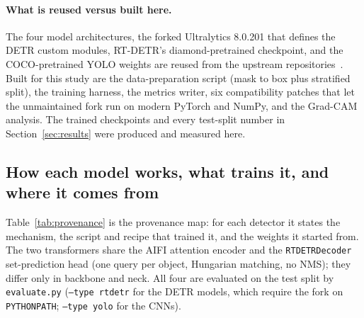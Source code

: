 \documentclass[11pt,a4paper]{article}
\begin{document}
\paragraph{What is reused versus built here.}
The four model architectures, the forked Ultralytics 8.0.201 that defines the DETR custom modules,
RT-DETR's diamond-pretrained checkpoint, and the COCO-pretrained YOLO weights are reused from the
upstream repositories~\cite{diamond,ultralytics}. Built for this study are the data-preparation
script (mask to box plus stratified split), the training harness, the metrics writer, six
compatibility patches that let the unmaintained fork run on modern PyTorch and NumPy, and the
Grad-CAM analysis. The trained checkpoints and every test-split number in Section~\ref{sec:results}
were produced and measured here.

\subsection{How each model works, what trains it, and where it comes from}
Table~\ref{tab:provenance} is the provenance map: for each detector it states the mechanism, the
script and recipe that trained it, and the weights it started from. The two transformers share the
AIFI attention encoder and the \texttt{RTDETRDecoder} set-prediction head (one query per object,
Hungarian matching, no NMS); they differ only in backbone and neck. All four are evaluated on the
test split by \texttt{evaluate.py} (\texttt{--type rtdetr} for the DETR models, which require the
fork on \texttt{PYTHONPATH}; \texttt{--type yolo} for the CNNs).
\end{document}
